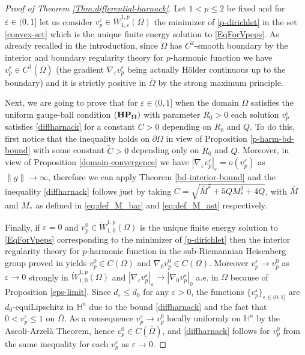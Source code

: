 \documentclass[10pt]{amsart}
\numberwithin{equation}{section}
\theoremstyle{definition}
\newcommand{\He}{\mathbb{H}}
\begin{document}
\begin{proof}[Proof of Theorem \ref{Thm:differential-harnack}]
Let $1<p\leq 2$ be fixed and for $\varepsilon \in(0,1]$ let us consider $v^\varepsilon_p \in \dot{W}^{1,p}_{1,\varepsilon}(\Omega)$ the minimizer of \eqref{p-dirichlet} in the set \eqref{convex-set} which is the unique finite energy solution to \eqref{EqForVpeps}. As already recalled in the introduction, since $\Omega$ has $C^2$-smooth boundary by the interior and boundary regularity theory for $p$-harmonic function we have $v^\varepsilon_p \in C^{1}(\overline{\Omega})$ (the gradient $\nabla_\varepsilon v^\varepsilon_p$ being actually H\"{o}lder continuous up to the boundary) and it is strictly positive in $\overline{\Omega}$ by the strong maximum principle. 

Next, we are going to prove that for $\varepsilon \in (0,1]$ when the domain $\Omega$ satisfies the uniform gauge-ball condition $(\bf{HP_\Omega})$ with parameter $R_0>0$ each solution $v^\varepsilon_p$ satisfies \eqref{diffharnack} for a constant $C>0$ depending on $R_0$ and $Q$. To do this, first notice that the inequality holds on $\partial \Omega$ in view of Proposition \ref{p-harm-bd-bound} with some constant $\widetilde{C}>0$ depending only on $R_0$ and $Q$.  Moreover, in view of Proposition \ref{domain-convergence} we have $|\nabla_\varepsilon  v^\varepsilon_p|_\varepsilon=o(v^\varepsilon_p)$ as $\| g\| \to \infty$, therefore we can apply Theorem \ref{bd-interior-bound} and the inequality \eqref{diffharnack} follows just by taking $C=\sqrt{ \overline{M}^{2} + 5QM_{\ast}^2 + 4Q }$, with $\overline{M}$ and $M_*$ as defined in \eqref{eq:def_M_bar} and \eqref{eq:def_M_ast} respectively. 


Finally, if $\varepsilon=0$ and $v^0_p \in \dot{W}^{1,p}_{1,0}(\Omega)$ is the unique finite energy solution to 
\eqref{EqForVpeps} corresponding to the minimizer of \eqref{p-dirichlet} then the interior regularity theory for $p$-harmonic function in the sub-Riemannian Heisenberg group proved in \cite{Zhong} yields $v^0_p \in C(\Omega)$ and $\nabla_0 v^0_p\in C(\Omega)$. Moreover $v^\varepsilon_p \to v^0_p$ as $\varepsilon \to 0$ strongly in $\dot{W}^{1,p}_{1,0}(\Omega)$ and $|\nabla_\varepsilon  v^\varepsilon_p|_\varepsilon \to |\nabla_0  v^\varepsilon_p|_0$ a.e. in $\Omega$ because of Proposition \ref{eps-limit}. Since $d_\varepsilon\leq d_0$ for any $\varepsilon>0$, the functions $\{ v^\varepsilon_p\}_{\varepsilon \in (0,1]}$ are $d_0$-equiLipschitz in $\He^n$ due to the bound \eqref{diffharnack} and the fact that $0 < v^\varepsilon_p \leq 1$ on $\overline{\Omega}$. As a consequence $v^\varepsilon_p \to v^0_p$ locally uniformly on $\He^n$ by the Ascoli-Arzel\`a Theorem, hence $v^0_p \in C(\overline{\Omega})$, and \eqref{diffharnack} follows for $v^0_p$ from the same inequality for each $v^\varepsilon_p$ as $\varepsilon \to 0$.  
\end{proof}
\end{document}
